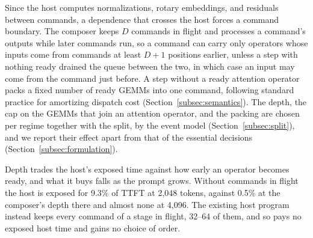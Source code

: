 Since the host computes normalizations, rotary embeddings, and residuals between commands, a dependence that crosses the host forces a command boundary.
The composer keeps $D$ commands in flight and processes a command's outputs while later commands run, so a command can carry only operators whose inputs come from commands at least $D+1$ positions earlier, unless a step with nothing ready drained the queue between the two, in which case an input may come from the command just before.
A step without a ready attention operator packs a fixed number of ready GEMMs into one command, following standard practice for amortizing dispatch cost (Section~\ref{subsec:semantics}).
The depth, the cap on the GEMMs that join an attention operator, and the packing are chosen per regime together with the split, by the event model (Section~\ref{subsec:split}), and we report their effect apart from that of the essential decisions (Section~\ref{subsec:formulation}).

Depth trades the host's exposed time against how early an operator becomes ready, and what it buys falls as the prompt grows.
Without commands in flight the host is exposed for 9.3\% of TTFT at 2{,}048 tokens, against 0.5\% at the composer's depth there and almost none at 4{,}096.
The existing host program instead keeps every command of a stage in flight, 32--64 of them, and so pays no exposed host time and gains no choice of order.

